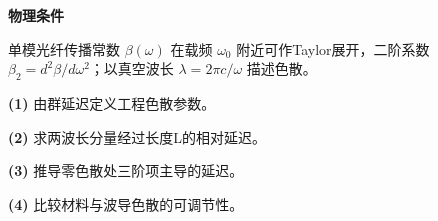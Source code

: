 \textbf{物理条件}\par 单模光纤传播常数 \(\beta(\omega)\) 在载频 \(\omega_0\) 附近可作Taylor展开，二阶系数 \(\beta_2=d^2\beta/d\omega^2\)；以真空波长 \(\lambda=2\pi c/\omega\) 描述色散。
\par\noindent\textbf{(1)} 由群延迟定义工程色散参数。
\par\noindent\textbf{(2)} 求两波长分量经过长度L的相对延迟。
\par\noindent\textbf{(3)} 推导零色散处三阶项主导的延迟。
\par\noindent\textbf{(4)} 比较材料与波导色散的可调节性。
